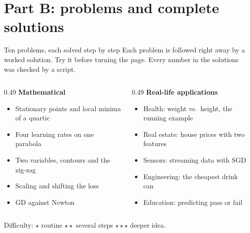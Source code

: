 \section{Part B: problems and complete solutions}

\begin{frame}{Ten problems, each solved step by step}
  \small
  Each problem is followed \alert{right away} by a worked solution. Try it before turning the page.
  Every number in the solutions was checked by a script.

  \vspace{4pt}
  \begin{columns}[T]
    \begin{column}{0.49\textwidth}
      \textbf{Mathematical}
      \begin{itemize}\footnotesize
        \item[M1] Stationary points and local minima of a quartic
        \item[M2] Four learning rates on one parabola
        \item[M3] Two variables, contours and the zig-zag
        \item[M4] Scaling and shifting the loss
        \item[M5] GD against Newton
      \end{itemize}
    \end{column}
    \begin{column}{0.49\textwidth}
      \textbf{Real-life applications}
      \begin{itemize}\footnotesize
        \item[A1] Health: weight vs.\ height, the running example
        \item[A2] Real estate: house prices with two features
        \item[A3] Sensors: streaming data with SGD
        \item[A4] Engineering: the cheapest drink can
        \item[A5] Education: predicting pass or fail
      \end{itemize}
    \end{column}
  \end{columns}

  \vspace{4pt}
  \footnotesize\textcolor{mGrey}{Difficulty: $\star$ routine \quad $\star\star$ several steps \quad $\star\star\star$ deeper idea.}
\end{frame}
